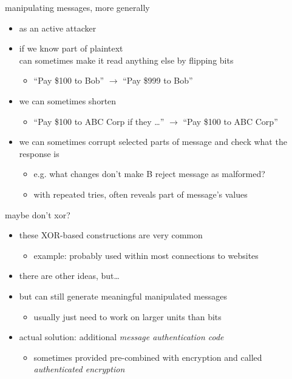 \begin{frame}{manipulating messages, more generally}
\begin{itemize}
\item as an active attacker
\vspace{.5cm}
\item if we know part of plaintext \\
    can sometimes make it read anything else by flipping bits
    \begin{itemize}
    \item ``Pay \$100 to Bob'' $\rightarrow$ ``Pay \$999 to Bob''
    \end{itemize}
\item we can sometimes shorten 
    \begin{itemize}
    \item ``Pay \$100 to ABC Corp if they \ldots'' $\rightarrow$ ``Pay \$100 to ABC Corp''
    \end{itemize}
\item we can sometimes corrupt selected parts of message and check what the response is
    \begin{itemize}
    \item e.g. what changes don't make B reject message as malformed?
    \item with repeated tries, often reveals part of message's values
    \end{itemize}
\end{itemize}
\end{frame}

\begin{frame}{maybe don't xor?}
    \begin{itemize}
    \item these XOR-based constructions are very common 
        \begin{itemize}
        \item example: probably used within most connections to websites
        \end{itemize}
    \item there are other ideas, but\ldots
    \item but can still generate meaningful manipulated messages
        \begin{itemize}
        \item usually just need to work on larger units than bits
        \end{itemize}
    \vspace{.5cm}
    \item actual solution: additional \textit{message authentication code}
        \begin{itemize}
        \item sometimes provided pre-combined with encryption and called \textit{authenticated encryption}
        \end{itemize}
    \end{itemize}
\end{frame}
